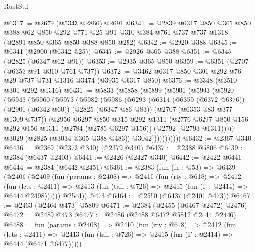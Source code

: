 \begin{lexlean}{RustStd}
\begin{coremodule}
@6317 := @2679 (@5343 @2866) @2691
@6341 := @2839
    @6317
    @850
    @365
    @850
    @388
    @62
    @850
    @292
    @771
    @25
    @91
    @310
    @384
    @761
    @737
    @737
    @1318
    (@2891 @850 @365 @850 @388 @850 @292)
@6342 := @2920 @388
@6345 := @6341 (@2900 (@6342 @25))
@6347 := @2926 @365 @388
@6351 := @6345 (@2825 (@6347 @62 @91))
@6353 := @2935 @365 @850
@6359 := @6351 (@2707 (@6353 @91 @310 @761 @737))
@6372 := @3462 @6317 @850 @301 @292 @76 @29 @737 @731 @1316 @3474 (@3935 @6317 @850)
@6376 := @3348 (@3510 @301 @292 @1316)
@6431 := @5833
    (@5858
      (@5899
        (@5901
          (@5903
            (@5920
              (@5943
                (@5960
                  (@5973
                    (@5982
                      (@5986
                        (@6293
                          (@6314
                            (@6359 (@6372 @6376))
                            (@2900 (@6342 @60))
                            (@2825 (@6347 @86 @83))
                            (@2707 (@6353 @83 @377 @1309 @737))
                            (@2956
                              @6297
                              @850
                              @315
                              @292
                              @1311
                              (@2776
                                @6297
                                @850
                                @156
                                @292
                                @156
                                @1311
                                (@2784 (@2785 @6297 @156))
                                (@2792 (@2793 @1311)))))
                          @3029
                          (@2825 (@3034 @365 @388 @483))
                          @3042)))))))))))
@6432 := @2367 @340
@6436 := @2369 (@2373 @340) (@2379 @340)
@6437 := @2388 @5806
@6439 := @2384 (@6437 @2403)
@6441 := @2426 (@2427 @340)
@6442 := @2422 @6441
@6444 := @2384 (@6442 @2451)
@6461 := @2383
    (fun (fn : @53) =>
    @6439
      (@2406
        (@2409
          (fun (params : @2408) =>
          @2410
            (fun (rty : @618) =>
            @2412
              (fun (lets : @2411) =>
              @2413 (fun (tail : @726) => @2415 (fun (Γ : @2414) => @6444 @2498))))))
        @2544))
    @473
@6464 := @2550 (@6437 (@2401 @473))
@6467 := @2463 (@2464 @473) @5809
@6471 := @2384 (@2455 (@6467 @2472) @2476)
@6472 := @2489 @473
@6477 := @2486 (@2488 @6472 @5812 @2444 @2446)
@6488 := fun (params : @2408) =>
  @2410
    (fun (rty : @618) =>
    @2412
      (fun (lets : @2411) =>
      @2413 (fun (tail : @726) => @2415 (fun (Γ : @2414) => @6444 (@6471 @6477)))))

\end{coremodule}
\end{lexlean}
